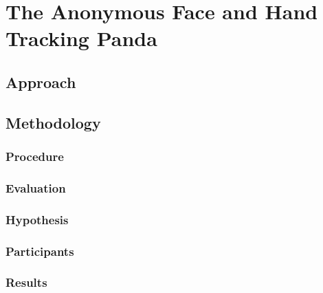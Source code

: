 \section{The Anonymous Face and Hand Tracking Panda}

\subsection{Approach}

\subsection{Methodology}

\subsubsection{Procedure}

\subsubsection{Evaluation}

\subsubsection{Hypothesis}

\subsubsection{Participants}

\subsubsection{Results}
